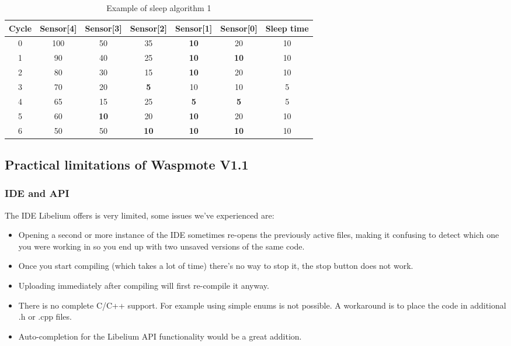 \begin{table}[!ht]
\begin{center}
\begin{tabular}[!ht]{|c|c|c|c|c|c|c|}
\hline
\textbf{Cycle} & \textbf{Sensor[4]} & \textbf{Sensor[3]} & \textbf{Sensor[2]} & \textbf{Sensor[1]} &\textbf{Sensor[0]} & \textbf{Sleep time}\\
\hline
0 & 100 & 50 & 35 & \textbf{10} & 20 & 10\\
\hline
1 & 90 & 40 & 25 & \textbf{10} & \textbf{10} & 10\\
\hline
2 & 80 & 30 & 15 & \textbf{10} & 20 & 10\\
\hline
3 & 70 & 20 & \textbf{5} & 10 & 10 & 5\\
\hline
4 & 65 & 15 & 25 & \textbf{5} & \textbf{5} & 5\\
\hline
5 & 60 & \textbf{10} & 20 & \textbf{10} & 20 & 10\\
\hline
6 & 50 & 50 & \textbf{10} & \textbf{10} & \textbf{10} & 10\\
\hline
\end{tabular}
\caption{Example of sleep algorithm 1}
\label{tab:sleep2}
\end{center}
\end{table}

\clearpage
\subsection{Practical limitations of Waspmote V1.1}
\subsubsection{IDE and API}
The IDE Libelium offers is very limited, some issues we've experienced are:\\
\begin{itemize}
\item Opening a second or more instance of the IDE sometimes re-opens the previously active files, making it confusing to detect which one you were working in so you end up with two unsaved versions of the same code.
\item Once you start compiling (which takes a lot of time) there's no way to stop it, the stop button does not work.
\item Uploading immediately after compiling will first re-compile it anyway.
\item There is no complete C/C++ support. For example using simple enums is not possible. A workaround is to place the code in additional .h or .cpp files.
\item Auto-completion for the Libelium API functionality would be a great addition.
\end{itemize}
\bigskip
